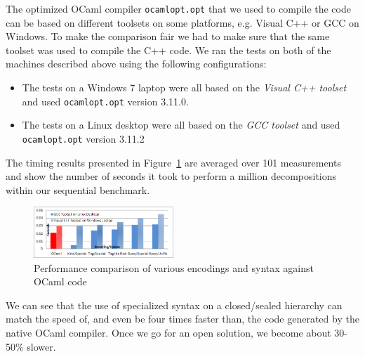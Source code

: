 The optimized OCaml compiler \texttt{ocamlopt.opt} that we used to compile the code 
can be based on different toolsets on some platforms, e.g. Visual C++ or GCC 
on Windows. To make the comparison fair we had to make sure that the 
same toolset was used to compile the C++ code. We ran the tests 
on both of the machines described above using the following configurations: 

\begin{itemize}
\setlength{\itemsep}{0pt}
\setlength{\parskip}{0pt}
\item The tests on a Windows 7 laptop were all based on the \emph{Visual C++ toolset} 
      and used \texttt{ocamlopt.opt} version 3.11.0.
\item The tests on a Linux desktop were all based on the \emph{GCC toolset} and used 
      \texttt{ocamlopt.opt} version 3.11.2
\end{itemize}

\noindent
The timing results presented in Figure~\ref{fig:OCamlComparison} are averaged 
over 101 measurements and show the number of seconds it took to perform a 
million decompositions within our sequential benchmark.

\begin{figure}[htbp]
  \centering
    \includegraphics[width=0.47\textwidth]{OCamlComparison.png}
  \caption{Performance comparison of various encodings and syntax against OCaml code}
  \label{fig:OCamlComparison}
\end{figure}

We can see that the use of specialized syntax on a closed/sealed hierarchy can 
match the speed of, and even be four times faster than, the code generated by 
the native OCaml compiler. Once we go for an open solution, we become about 
30-50\% slower. 
